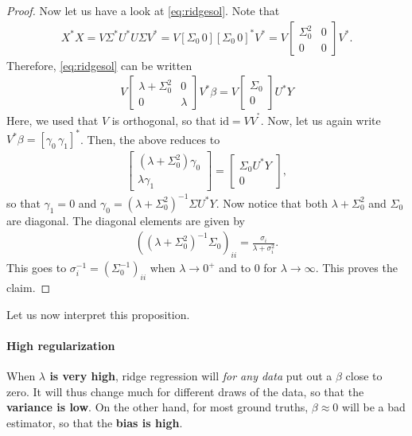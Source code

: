 \documentclass{article}
\newcommand{\id}{\mathrm{id}}
\begin{document}
\begin{proof}
    Now let us have a look at \eqref{eq:ridgesol}. Note that 
\begin{align*}
    X^*X = V\Sigma^*U^*U \Sigma V^* = V  [\Sigma_0 \, 0] [\Sigma_0 \, 0]^* V^* = V\begin{bmatrix} \Sigma_0^2 & 0 \\ 0 & 0 \end{bmatrix} V^*.
\end{align*}
Therefore,  \eqref{eq:ridgesol} can be written
\begin{align*}
    V\begin{bmatrix} \lambda + \Sigma_0^2 & 0 \\ 0 & \lambda \end{bmatrix} V^*\beta = V\begin{bmatrix} \Sigma_0 \\ 0 \end{bmatrix} U^*Y
\end{align*}
Here, we used that $V$ is orthogonal, so that $\id = VV^^*$. Now, let us again write $V^* \beta = [\gamma_0 \, \gamma_1]^*$. Then, the above reduces to 
    \begin{align*}
        \begin{bmatrix} (\lambda + \Sigma_0^2) \gamma_0 \\ \lambda \gamma_1 \end{bmatrix} = \begin{bmatrix}
            \Sigma_0 U^*Y \\ 0 
        \end{bmatrix},
    \end{align*} 
    so that $\gamma_1 = 0$ and $\gamma_0 = (\lambda + \Sigma_0^2)^{-1}\Sigma U^*Y$. Now notice that both $\lambda + \Sigma_0^2$ and $\Sigma_0$ are diagonal. The diagonal elements are given by
    \begin{align*}
        ((\lambda + \Sigma_0^2)^{-1}\Sigma_0)_{ii} = \frac{\sigma_i}{\lambda +\sigma_i^2}.
    \end{align*}
    This goes to $\sigma_i^{-1}=(\Sigma_0^{-1})_{ii}$ when $\lambda\to 0^+$ and to $0$ for $\lambda \to \infty$. This proves the claim.

\end{proof}

Let us now interpret this proposition.

\paragraph{High regularization} When \textbf{$\lambda$ is very high}, ridge regression will \emph{for any data} put out a $\beta$ close to zero.  It will thus change much for different draws of the data, so that the \textbf{variance is low}. On the other hand, for most ground truths, $\beta\approx 0$ will be a bad estimator, so that the \textbf{bias is high}.
\end{document}
